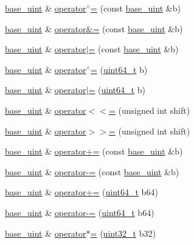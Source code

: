 \begin{DoxyCompactItemize}
\item 
\hyperlink{classbase__uint}{base\+\_\+uint} \& \hyperlink{classbase__uint_ad5ec10977ebeab115fe857637990e267}{operator$^\wedge$=} (const \hyperlink{classbase__uint}{base\+\_\+uint} \&b)
\item 
\hyperlink{classbase__uint}{base\+\_\+uint} \& \hyperlink{classbase__uint_a6cb549b322e5bbcca794366f5fd3fb15}{operator\&=} (const \hyperlink{classbase__uint}{base\+\_\+uint} \&b)
\item 
\hyperlink{classbase__uint}{base\+\_\+uint} \& \hyperlink{classbase__uint_ab116d89cbae68b32fbecf5d1de98bb2e}{operator$\vert$=} (const \hyperlink{classbase__uint}{base\+\_\+uint} \&b)
\item 
\hyperlink{classbase__uint}{base\+\_\+uint} \& \hyperlink{classbase__uint_a3d77324f5c5166e4dabadac360bea6e7}{operator$^\wedge$=} (\hyperlink{stdint_8h_aaa5d1cd013383c889537491c3cfd9aad}{uint64\+\_\+t} b)
\item 
\hyperlink{classbase__uint}{base\+\_\+uint} \& \hyperlink{classbase__uint_ac8edb6e097d9eede21f8fa44e9184913}{operator$\vert$=} (\hyperlink{stdint_8h_aaa5d1cd013383c889537491c3cfd9aad}{uint64\+\_\+t} b)
\item 
\hyperlink{classbase__uint}{base\+\_\+uint} \& \hyperlink{classbase__uint_acb449d2fcb5af767fa6b01890e836a4e}{operator$<$$<$=} (unsigned int shift)
\item 
\hyperlink{classbase__uint}{base\+\_\+uint} \& \hyperlink{classbase__uint_a4e0344432bbcce79525fd2c182173b3b}{operator$>$$>$=} (unsigned int shift)
\item 
\hyperlink{classbase__uint}{base\+\_\+uint} \& \hyperlink{classbase__uint_a8fb3109e7c46536bb66ac41242176246}{operator+=} (const \hyperlink{classbase__uint}{base\+\_\+uint} \&b)
\item 
\hyperlink{classbase__uint}{base\+\_\+uint} \& \hyperlink{classbase__uint_a89d8332840076ec102839b8a10dda9b4}{operator-\/=} (const \hyperlink{classbase__uint}{base\+\_\+uint} \&b)
\item 
\hyperlink{classbase__uint}{base\+\_\+uint} \& \hyperlink{classbase__uint_a14f2b12970b3198d65abafb2615207ca}{operator+=} (\hyperlink{stdint_8h_aaa5d1cd013383c889537491c3cfd9aad}{uint64\+\_\+t} b64)
\item 
\hyperlink{classbase__uint}{base\+\_\+uint} \& \hyperlink{classbase__uint_ab64f7a7a87b9af5ea345e4678b4cc1e9}{operator-\/=} (\hyperlink{stdint_8h_aaa5d1cd013383c889537491c3cfd9aad}{uint64\+\_\+t} b64)
\item 
\hyperlink{classbase__uint}{base\+\_\+uint} \& \hyperlink{classbase__uint_aa70b7d954258d2cd4bb77721e357fd40}{operator$\ast$=} (\hyperlink{stdint_8h_a435d1572bf3f880d55459d9805097f62}{uint32\+\_\+t} b32)

\end{DoxyCompactItemize}
